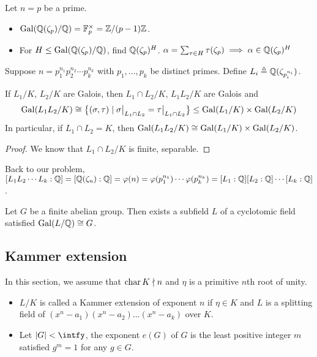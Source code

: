 \begin{example}
  Let $n = p$ be a prime.
  \begin{itemize}
    \item $\operatorname{Gal}(\mathbb{Q}(\zeta_p) / \mathbb{Q}) = \mathbb{F}_p^\times = \mathbb{Z} / (p-1)\mathbb{Z}$.
    \item For $H \leq \operatorname{Gal}(\mathbb{Q}(\zeta_p) / \mathbb{Q})$, find $\mathbb{Q}(\zeta_p)^H$. 
      $\alpha = \sum_{\tau \in H} \tau(\zeta_p) \implies \alpha \in \mathbb{Q}(\zeta_p)^H$

  \end{itemize}
\end{example}
\begin{example}
  Suppose $n = p_1^{n_1} p_2^{n_2} \cdots p_k^{n_k}$ with $p_1, \dots, p_k$ be distinct primes.
  Define $L_i \triangleq \mathbb{Q}(\zeta_{p_i^{n_i}})$.
\end{example}

\begin{lemma}
  If $L_1 / K$, $L_2 / K$ are Galois, then $L_1 \cap L_2 / K$, $L_1 L_2 / K$ are Galois and
  \[ \operatorname{Gal}( L_1 L_2 / K) \cong \big\{ (\sigma, \tau) \mid \sigma\big|_{L_1 \cap L_2} = \tau\big|_{L_1 \cap L_2} \big\}
    \leq \operatorname{Gal}(L_1 / K) \times \operatorname{Gal}(L_2 / K) \]
  In particular, if $L_1 \cap L_2 = K$, then $\operatorname{Gal}(L_1 L_2 / K) \cong \operatorname{Gal}(L_1 / K) \times \operatorname{Gal}(L_2 / K)$.

  \begin{proof}
    We know that $L_1 \cap L_2 / K$ is finite, separable.
  \end{proof}
\end{lemma}

Back to our problem, $[L_1 L_2 \cdots L_k: \mathbb{Q}] = [\mathbb{Q}(\zeta_n): \mathbb{Q}] = \varphi(n) = \varphi(p_1^{n_1})
\cdots \varphi(p_k^{n_k}) = [L_1 : \mathbb{Q}] [L_2 : \mathbb{Q}] \cdots [L_k : \mathbb{Q}]$.

\begin{theorem}
  Let $G$ be a finite abelian group. Then exists a subfield $L$ of a cyclotomic field satisfied $\operatorname{Gal}(L / \mathbb{Q}) \cong G$.
\end{theorem}

\subsection{Kammer extension}
In this section, we assume that $\operatorname{char} K \nmid n$ and $\eta$ is a primitive $n$th root of unity.

\begin{definition} \hfill
  \begin{itemize}
    \item $L/K$ is called a Kammer extension of exponent $n$ if $\eta \in K$ and $L$ is a splitting field
      of $(x^n - a_1) (x^n - a_2) \dots (x^n - a_k)$ over $K$.
    \item Let $\abs{G} < \intfy$, the exponent $e(G)$ of $G$ is the least positive integer $m$
      satisfied $g^m = 1$ for any $g \in G$.
  \end{itemize}
\end{definition}

